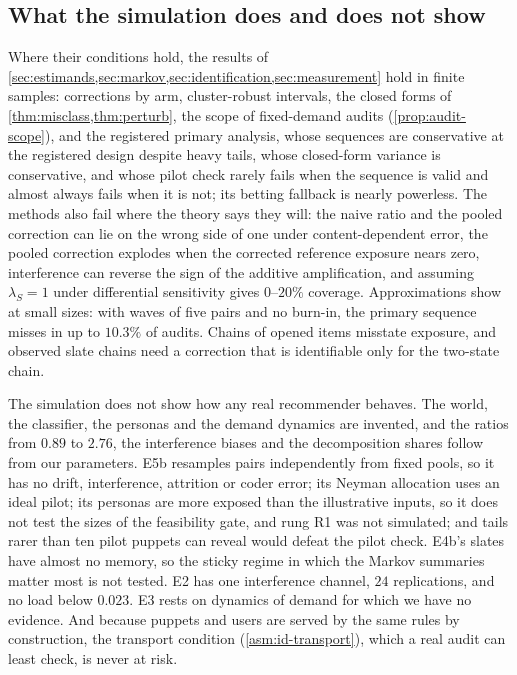 \subsection{What the simulation does and does not show}\label{sec:sim-scope}

Where their conditions hold, the results of \cref{sec:estimands,sec:markov,sec:identification,sec:measurement} hold in finite samples: corrections by arm, cluster-robust intervals, the closed forms of \cref{thm:misclass,thm:perturb}, the scope of fixed-demand audits (\cref{prop:audit-scope}), and the registered primary analysis, whose sequences are conservative at the registered design despite heavy tails, whose closed-form variance is conservative, and whose pilot check rarely fails when the sequence is valid and almost always fails when it is not; its betting fallback is nearly powerless. The methods also fail where the theory says they will: the naive ratio and the pooled correction can lie on the wrong side of one under content-dependent error, the pooled correction explodes when the corrected reference exposure nears zero, interference can reverse the sign of the additive amplification, and assuming $\lambda_S=1$ under differential sensitivity gives $0$--$20\%$ coverage. Approximations show at small sizes: with waves of five pairs and no burn-in, the primary sequence misses in up to $10.3\%$ of audits. Chains of opened items misstate exposure, and observed slate chains need a correction that is identifiable only for the two-state chain.

The simulation does not show how any real recommender behaves. The world, the classifier, the personas and the demand dynamics are invented, and the ratios from $0.89$ to $2.76$, the interference biases and the decomposition shares follow from our parameters. E5b resamples pairs independently from fixed pools, so it has no drift, interference, attrition or coder error; its Neyman allocation uses an ideal pilot; its personas are more exposed than the illustrative inputs, so it does not test the sizes of the feasibility gate, and rung R1 was not simulated; and tails rarer than ten pilot puppets can reveal would defeat the pilot check. E4b's slates have almost no memory, so the sticky regime in which the Markov summaries matter most is not tested. E2 has one interference channel, $24$ replications, and no load below $0.023$. E3 rests on dynamics of demand for which we have no evidence. And because puppets and users are served by the same rules by construction, the transport condition (\cref{asm:id-transport}), which a real audit can least check, is never at risk.
